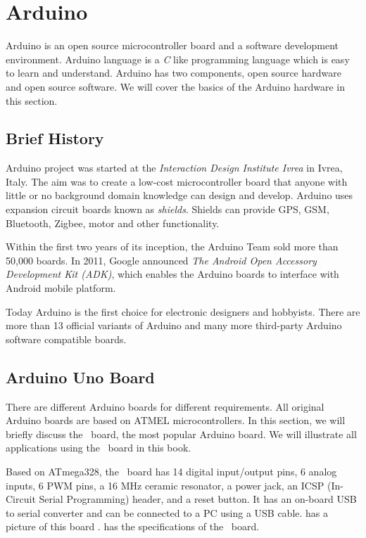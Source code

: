 \section {Arduino}
Arduino is an open source microcontroller board and a software
development environment. Arduino language is a \emph{C} like
programming language which is easy to learn and understand.  Arduino
has two components, open source hardware and open source software.  We
will cover the basics of the Arduino hardware in this section.

\subsection{Brief History}
Arduino project was started at the \emph{Interaction Design Institute
  Ivrea} in Ivrea, Italy. The aim was to create a low-cost
microcontroller board that anyone with little or no background domain
knowledge can design and develop. Arduino uses expansion circuit
boards known as \emph{shields}. Shields can provide GPS, GSM,
Bluetooth, Zigbee, motor and other functionality.

Within the first two years of its inception, the Arduino Team sold
more than 50,000 boards. In 2011, Google announced \emph{The Android
  Open Accessory Development Kit (ADK)}, which enables the Arduino boards to
interface with Android mobile platform.

Today Arduino is the first choice for electronic designers and
hobbyists. There are  more than 13 official variants of Arduino and
many more third-party Arduino software compatible boards.

\subsection{Arduino Uno Board}
There are different Arduino boards for different requirements. All
original Arduino boards are based on ATMEL microcontrollers.  In this
section, we will briefly discuss the \arduino\ board, the most popular
Arduino board.  We will illustrate all applications using the
\arduino\ board in this book.

Based on ATmega328, the \arduino\ board has 14 digital input/output
pins, 6 analog inputs, 6 PWM pins, a 16 MHz ceramic resonator, a power
jack, an ICSP (In-Circuit Serial Programming) header, and a reset
button. It has an on-board USB to serial converter and can be connected
to a PC using a USB cable.  has a picture of this board
\cite{uno-ref}.  has the specifications of the
\arduino\ board.

